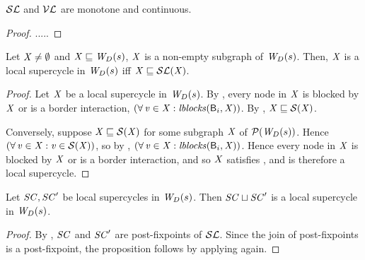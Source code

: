 \begin{proposition} \label{prop:monotoneLoc}
$\lSFs$ and $\lVFs$ are monotone and continuous.
\end{proposition}
%
\begin{proof}
.....
\end{proof}




\begin{proposition} \label{prop:locGFP} \label{prop:supercycleGFPLoc}
Let $\XS \ne \ewfg$ and $\XS \subg \lwfg{B}{s}{\DS}$, \ie $\XS$ is a non-empty subgraph of $\lwfg{B}{s}{\DS}$.
Then, $\XS$ is a local supercycle in $\lwfg{B}{s}{\DS}$ iff $\XS \subg \lSF{\XS}$.
\end{proposition}
%
\begin{proof}
Let $\XS$ be a local supercycle in $\lwfg{B}{s}{\DS}$. By , every node in $\XS$ is blocked by $\XS$ or is a border interaction, \ie 
$(\fa \ndv \in \XS: \lblocks{\B_i}{\XS})$. By , $\XS \subg \SF{\XS}$.

Conversely, suppose $\XS \subg \SF{\XS}$ for some subgraph $\XS$ of $\lwfgS{B}{s}{\DS}$. Hence 
$(\fa \ndv \in \XS: \ndv \in \SF{\XS})$, so by , $(\fa \ndv \in \XS: \lblocks{\B_i}{\XS})$.
Hence every node in $\XS$ is blocked by $\XS$ or is a border interaction, and so $\XS$ satisfies , and is therefore a local supercycle.
\end{proof}

%
\begin{proposition} \label{prop:supercycleLoc:union}
Let $\SC, \SC'$ be local supercycles in $\lwfg{B}{s}{\DS}$. Then $\SC \join \SC'$ is
a local supercycle in $\lwfg{B}{s}{\DS}$.
\end{proposition}
%
\begin{proof}
By , $\SC$ and $\SC'$ are post-fixpoints of $\lSFs$. Since the join of post-fixpoints is a post-fixpoint, 
the proposition follows by applying  again.
\end{proof}


